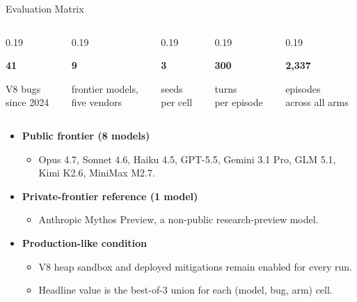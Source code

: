 \documentclass[aspectratio=169,t]{beamer}
\newcommand{\metric}[2]{%
  \begin{minipage}[t]{\linewidth}\raggedright
    {\fontsize{18}{20}\selectfont\bfseries #1\par}
    \vspace{0.2em}
    {\scriptsize\color{blackSecondary}#2\par}
  \end{minipage}%
}
\begin{document}
\begin{frame}{Evaluation Matrix}
  \blackfiguretop
  \begin{columns}[T,onlytextwidth]
    \begin{column}{0.19\textwidth}\metric{41}{V8 bugs\\since 2024}
    \end{column}
    \begin{column}{0.19\textwidth}\metric{9}{frontier models,\\five vendors}
    \end{column}
    \begin{column}{0.19\textwidth}\metric{3}{seeds\\per cell}
    \end{column}
    \begin{column}{0.19\textwidth}\metric{300}{turns\\per episode}
    \end{column}
    \begin{column}{0.19\textwidth}\metric{2{,}337}{episodes\\across all arms}
    \end{column}
  \end{columns}

  \vspace{1.1em}
  \begin{itemize}\small
    \item \textbf{Public frontier (8 models)}
      \begin{itemize}
        \item Opus 4.7, Sonnet 4.6, Haiku 4.5, GPT-5.5, Gemini 3.1 Pro, GLM 5.1, Kimi K2.6, MiniMax M2.7.
      \end{itemize}
    \item \textbf{Private-frontier reference (1 model)}
      \begin{itemize}
        \item Anthropic Mythos Preview, a non-public research-preview model.
      \end{itemize}
    \item \textbf{Production-like condition}
      \begin{itemize}
        \item V8 heap sandbox and deployed mitigations remain enabled for every run.
        \item Headline value is the best-of-3 union for each (model, bug, arm) cell.
      \end{itemize}
  \end{itemize}
\end{frame}
\end{document}
